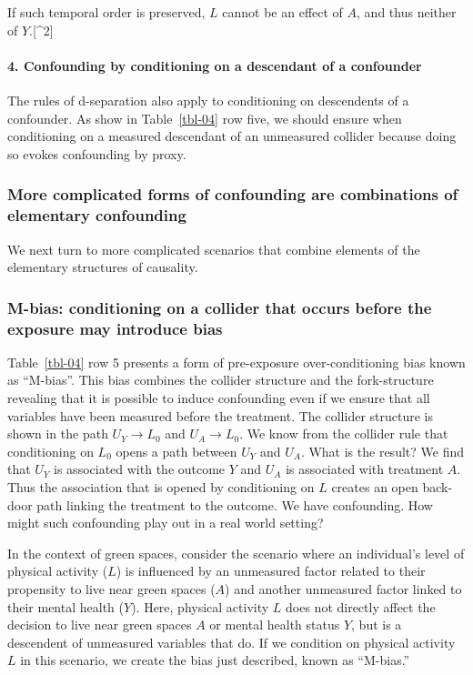 \documentclass[
  singlecolumn]{article}
\let\oldparagraph\paragraph
\renewcommand{\paragraph}[1]{\oldparagraph{#1}\mbox{}}
\begin{document}
If such temporal order is preserved, \(L\) cannot be an effect of \(A\),
and thus neither of \(Y\).{[}\^{}2{]}

\paragraph{4. Confounding by conditioning on a descendant of a
confounder}\label{confounding-by-conditioning-on-a-descendant-of-a-confounder}

The rules of d-separation also apply to conditioning on descendents of a
confounder. As show in Table~\ref{tbl-04} row five, we should ensure
when conditioning on a measured descendant of an unmeasured collider
because doing so evokes confounding by proxy.

\subsubsection{More complicated forms of confounding are combinations of
elementary
confounding}\label{more-complicated-forms-of-confounding-are-combinations-of-elementary-confounding}

We next turn to more complicated scenarios that combine elements of the
elementary structures of causality.

\subsubsection{M-bias: conditioning on a collider that occurs before the
exposure may introduce
bias}\label{m-bias-conditioning-on-a-collider-that-occurs-before-the-exposure-may-introduce-bias}

Table~\ref{tbl-04} row 5 presents a form of pre-exposure
over-conditioning bias known as ``M-bias''. This bias combines the
collider structure and the fork-structure revealing that it is possible
to induce confounding even if we ensure that all variables have been
measured before the treatment. The collider structure is shown in the
path \(U_Y \to L_0\) and \(U_A \to L_0\). We know from the collider rule
that conditioning on \(L_0\) opens a path between \(U_Y\) and \(U_A\).
What is the result? We find that \(U_Y\) is associated with the outcome
\(Y\) and \(U_A\) is associated with treatment \(A\). Thus the
association that is opened by conditioning on \(L\) creates an open
back-door path linking the treatment to the outcome. We have
confounding. How might such confounding play out in a real world
setting?

In the context of green spaces, consider the scenario where an
individual's level of physical activity (\(L\)) is influenced by an
unmeasured factor related to their propensity to live near green spaces
(\(A\)) and another unmeasured factor linked to their mental health
(\(Y\)). Here, physical activity \(L\) does not directly affect the
decision to live near green spaces \(A\) or mental health status \(Y\),
but is a descendent of unmeasured variables that do. If we condition on
physical activity \(L\) in this scenario, we create the bias just
described, known as ``M-bias.''
\end{document}

